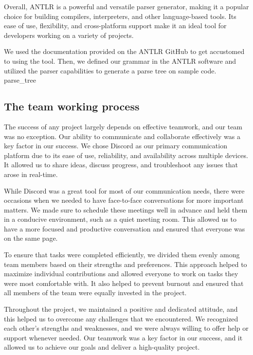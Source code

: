 Overall, ANTLR is a powerful and versatile parser generator, making it a popular choice for building compilers, interpreters, and other language-based tools. Its ease of use, flexibility, and cross-platform support make it an ideal tool for developers working on a variety of projects. 

We used the documentation provided on the ANTLR GitHub to get accustomed to using the tool. Then, we defined our grammar in the ANTLR software and utilized the parser capabilities to generate a parse tree on sample code.
{parse_tree}


\subsection{The team working process}
The success of any project largely depends on effective teamwork, and our team was no exception. Our ability to communicate and collaborate effectively was a key factor in our success. We chose Discord as our primary communication platform due to its ease of use, reliability, and availability across multiple devices. It allowed us to share ideas, discuss progress, and troubleshoot any issues that arose in real-time.

While Discord was a great tool for most of our communication needs, there were occasions when we needed to have face-to-face conversations for more important matters. We made sure to schedule these meetings well in advance and held them in a conducive environment, such as a quiet meeting room. This allowed us to have a more focused and productive conversation and ensured that everyone was on the same page.

To ensure that tasks were completed efficiently, we divided them evenly among team members based on their strengths and preferences. This approach helped to maximize individual contributions and allowed everyone to work on tasks they were most comfortable with. It also helped to prevent burnout and ensured that all members of the team were equally invested in the project.

Throughout the project, we maintained a positive and dedicated attitude, and this helped us to overcome any challenges that we encountered. We recognized each other's strengths and weaknesses, and we were always willing to offer help or support whenever needed. Our teamwork was a key factor in our success, and it allowed us to achieve our goals and deliver a high-quality project.

